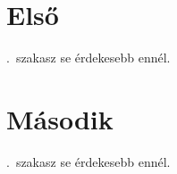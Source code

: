 \documentclass[a5paper]{article}
\begin{document}
\section{Első}\label{f1}
.\ szakasz se érdekesebb ennél.
\section{Második}\label{f2}
.\ szakasz se érdekesebb ennél.
\end{document}
